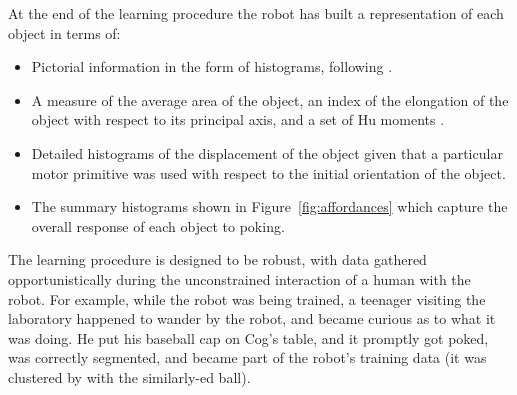 \ifrevised
At the end of the learning procedure the robot has built a
representation of each object in terms of:

{
\begin{itemize} \pflist
  \item Pictorial information in the form of \ahhcolor{} histograms,
        following \cite{swain91color}.
  \item A measure of the average area of the object, an
        index of the elongation of the object with respect to its principal
        axis, and a set of Hu moments \cite{hu62visual}.
  \item Detailed histograms of the displacement of the object given that a 
	particular motor primitive was used with respect to the initial 
	orientation of the object.
  \item The summary histograms shown in Figure~\ref{fig:affordances}
        which capture the overall response of each object to poking.
\end{itemize}
}

The learning procedure is designed to be robust, with data gathered
opportunistically during the unconstrained interaction of a human with
the robot.  For example, while the robot was being trained, a teenager
visiting the laboratory happened to wander by the robot, and became
curious as to what it was doing.  He put his baseball cap on Cog's
table, and it promptly got poked, was correctly segmented, and became
part of the robot's training data (it was clustered by \ahhcolor{} with
the similarly-\ahhcolor{}ed ball).



